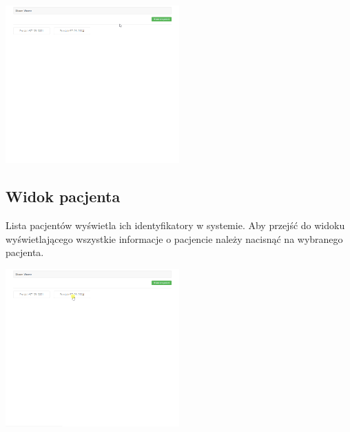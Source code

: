 \documentclass[a4paper,11pt,twoside]{report}
\theoremstyle{definition}
\begin{document}
\begin{minipage}{\linewidth}
	\centering
	\includegraphics[width=0.5\textwidth]{FrontScreen/Main/410.png}
\end{minipage}


\subsection{Widok pacjenta}

Lista pacjentów wyświetla ich identyfikatory w systemie. Aby przejść do widoku wyświetlającego wszystkie informacje o pacjencie należy nacisnąć na wybranego pacjenta.

\begin{minipage}{\linewidth}
	\centering
	\includegraphics[width=0.5\textwidth]{FrontScreen/Patient/0.png}
\end{minipage}
\end{document}
